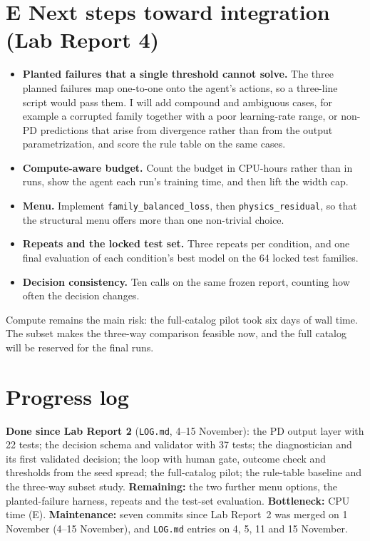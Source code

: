 \documentclass[11pt]{article}
\begin{document}
\section*{E \quad Next steps toward integration (Lab Report 4)}
\begin{itemize}
\item \textbf{Planted failures that a single threshold cannot solve.} The three planned failures
  map one-to-one onto the agent's actions, so a three-line script would pass them. I will add
  compound and ambiguous cases, for example a corrupted family together with a poor
  learning-rate range, or non-PD predictions that arise from divergence rather than from the
  output parametrization, and score the rule table on the same cases.
\item \textbf{Compute-aware budget.} Count the budget in CPU-hours rather than in runs, show the
  agent each run's training time, and then lift the width cap.
\item \textbf{Menu.} Implement \texttt{family\_balanced\_loss}, then \texttt{physics\_residual},
  so that the structural menu offers more than one non-trivial choice.
\item \textbf{Repeats and the locked test set.} Three repeats per condition, and one final
  evaluation of each condition's best model on the 64 locked test families.
\item \textbf{Decision consistency.} Ten calls on the same frozen report, counting how often the
  decision changes.
\end{itemize}
Compute remains the main risk: the full-catalog pilot took six days of wall time. The subset makes
the three-way comparison feasible now, and the full catalog will be reserved for the final runs.

\section*{Progress log}
\textbf{Done since Lab Report 2} (\texttt{LOG.md}, 4--15 November): the PD output layer with 22
tests; the decision schema and validator with 37 tests; the diagnostician and its first validated
decision; the loop with human gate, outcome check and thresholds from the seed spread; the
full-catalog pilot; the rule-table baseline and the three-way subset study.
\textbf{Remaining:} the two further menu options, the planted-failure harness, repeats and the
test-set evaluation. \textbf{Bottleneck:} CPU time (E).
\textbf{Maintenance:} seven commits since Lab Report~2 was merged on 1 November
(4--15 November), and \texttt{LOG.md} entries on 4, 5, 11 and 15 November.
\end{document}
